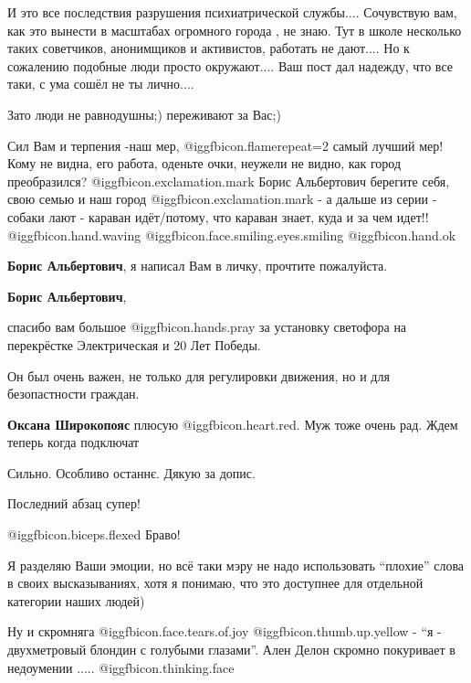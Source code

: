 \begin{itemize}
И это все последствия разрушения психиатрической службы.... Сочувствую вам, как
это вынести в масштабах огромного города , не знаю. Тут в школе несколько таких
советчиков, анонимщиков и активистов, работать не дают.... Но к сожалению
подобные люди просто окружают.... Ваш пост дал надежду, что все таки, с ума
сошёл не ты лично....

Зато люди не равнодушны;) переживают за Вас;)


Сил Вам и терпения -наш мер, @igg{fbicon.flame}{repeat=2} самый лучший мер! Кому не видна, его
работа, оденьте очки, неужели не видно, как город преобразился? @igg{fbicon.exclamation.mark} Борис Альбертович
берегите себя, свою семью и наш город @igg{fbicon.exclamation.mark} - а дальше из серии  - собаки лают -
караван идёт/потому, что караван знает, куда и за чем идет!! @igg{fbicon.hand.waving}  @igg{fbicon.face.smiling.eyes.smiling}  @igg{fbicon.hand.ok} 

\textbf{Борис Альбертович}, я написал Вам в личку, прочтите пожалуйста.

\textbf{Борис Альбертович}, 

спасибо вам большое  @igg{fbicon.hands.pray} за установку светофора на
перекрёстке Электрическая и 20 Лет Победы.

Он был очень важен, не только для регулировки движения, но и для безопастности
граждан.

\begin{itemize} %
\textbf{Оксана Широкопояс} плюсую @igg{fbicon.heart.red}. Муж тоже очень рад.
Ждем теперь когда подключат
\end{itemize} %

Сильно. Особливо останнє. Дякую за допис.

Последний абзац супер!

 @igg{fbicon.biceps.flexed} Браво!


Я разделяю Ваши эмоции, но всё таки мэру не надо использовать \enquote{плохие} слова в
своих высказываниях, хотя я понимаю, что это доступнее для отдельной категории
наших людей)



Ну и скромняга  @igg{fbicon.face.tears.of.joy}  @igg{fbicon.thumb.up.yellow}  - \enquote{я - двухметровый блондин с голубыми глазами}.
Ален Делон скромно покуривает в недоумении ..... @igg{fbicon.thinking.face} 


\end{itemize}
